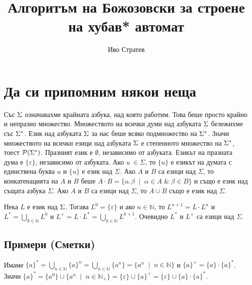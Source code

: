 \documentclass[12pt]{article}
\title{Алгоритъм на Божозовски за строене на хубав* автомат}
\author{Иво Стратев}
\begin{document}
\maketitle

\section{Да си припомним някои неща}

Със \(\Large\Sigma\) означавахме крайната азбука, над която работим. Това беше просто крайно и непразно множество.
Множеството на всички думи над азбуката \(\Large\Sigma\) бележихме със \(\Large\Sigma^*\).
Език над азбуката \(\Large\Sigma\)  за нас беше всяко подмножество на \(\Large\Sigma^*\).
Значи множеството на всички езици над азбуката \(\Large\Sigma\) е степенното множество на \(\Large\Sigma^*\),  тоест \(\Large{\mathcal{P}(\Sigma^*)}\).
Празният език е \(\emptyset\), независимо от азбуката.
Езикът на празната дума е \(\{\varepsilon\}\), независимо от азбуката.
Ако \(u\ \in \Sigma\), то \(\{u\}\) е езикът на думата с единствена буква \(u\) и \(\{u\}\) е език над \(\Sigma\).
Ако \(A\) и \(B\) са езици над \(\Sigma\), то конкатенацията на \(A\) и \(B\) беше \(A \cdot B = \{\alpha.\beta \; \mid \; \alpha \in A \; \& \; \beta \in B\} \) и също е език над същата азбука \(\Sigma\).
Ако \(A\) и \(B\) са езици над \(\Sigma\), то \(A \cup B\) също е език над \(\Sigma\). \\

\vspace{3mm}

Нека \(L\) е език над \(\Large\Sigma\). Тогава
\(L^0 = \{\varepsilon\}\) и ако \(n \in \mathbb{N}\), то \(L^{n + 1} = L \cdot L^n\) и \(L^* = \displaystyle{\bigcup_{k \in \mathbb{N}}} L^k\)
и \(L^+ = L \cdot L^* = \displaystyle{\bigcup_{k \in \mathbb{N}}} L^{k + 1}\).
Очевидно \(L^*\) и \(L^+\) са езици над \(\Sigma\).

\subsection{Примери (Сметки)}

Имаме \(\{a\}^* = \displaystyle{\bigcup_{n \in \mathbb{N}}} \{a\}^n
= \displaystyle{\bigcup_{n \in \mathbb{N}}} \{a^n\}
= \{a^n \; \mid \; n \in \mathbb{N}\}\) и \(\{a\}^+ = \{a\} \cdot \{a\}^* \). \\
Значи \(\{a\}^*
= \{a^0\} \cup \{a^n \; \mid \; n \in \mathbb{N}_+\}
= \{\varepsilon\} \cup \{a\}^+ 
= \{\varepsilon\} \cup \{a\} \cdot \{a\}^*\).
\end{document}
